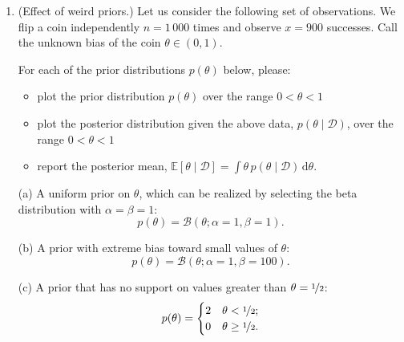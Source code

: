\documentclass{article}
\newcommand{\given}{\mid}
\newcommand{\mc}[1]{\mathcal{#1}}
\newcommand{\data}{\mc{D}}
\newcommand{\intd}[1]{\,\mathrm{d}{#1}}
\begin{document}
\begin{enumerate}
  Suppose we flip a coin $n = 10$ times and observe $x = 8$ ``heads.''
  What is the posterior distribution $p(\theta \given x, n)$?  What is
  the posterior probability that the coin is exactly fair?

  Note there is no probability density function corresponding to the
  prior. It will help to work in cases.

\item
  (Effect of weird priors.)  Let us consider the following set of
  observations. We flip a coin independently $n = 1\,000$ times and
  observe $x = 900$ successes. Call the unknown bias of the coin
  $\theta \in (0, 1)$.

  For each of the prior distributions $p(\theta)$ below, please:
  \begin{itemize}
  \item
    plot the prior distribution $p(\theta)$ over the range $0 < \theta < 1$
  \item
    plot the posterior distribution given the above data, $p(\theta
    \given \data)$, over the range $0 < \theta < 1$
  \item
    report the posterior mean,
    $\mathbb{E}[\theta \given \data] = \int \theta\,p(\theta\given\data)\intd\theta.$
  \end{itemize}

  (a) A uniform prior on $\theta$, which can be realized by selecting
  the beta distribution with $\alpha = \beta = 1$:
  \[
    p(\theta) = \mathcal{B}(\theta; \alpha = 1, \beta = 1).
  \]

  (b) A prior with extreme bias toward small values of $\theta$:
  \[
    p(\theta) = \mathcal{B}(\theta; \alpha = 1, \beta = 100).
  \]

  (c) A prior that has no support on values greater than $\theta =
  \nicefrac{1}{2}$:
  \[
    p(\theta) = \begin{cases} 2 & \theta <    \nicefrac{1}{2}; \\
                              0 & \theta \geq \nicefrac{1}{2}. \end{cases}
  \]


\end{enumerate}
\end{document}
